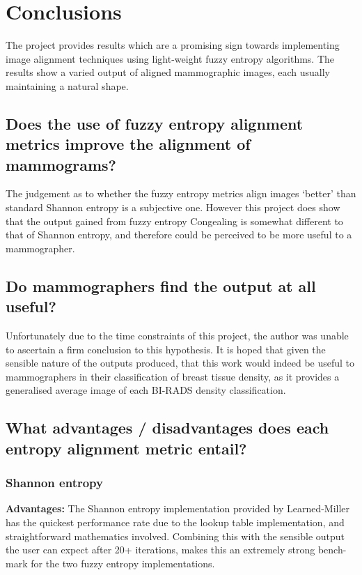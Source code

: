 \section{Conclusions}

The project provides results which are a promising sign towards implementing image alignment techniques using light-weight fuzzy entropy algorithms. The results show a varied output of aligned mammographic images, each usually maintaining a natural shape.

\subsection{Does the use of fuzzy entropy alignment metrics improve the alignment of mammograms?}

The judgement as to whether the fuzzy entropy metrics align images `better' than standard Shannon entropy is a subjective one. However this project does show that the output gained from fuzzy entropy \gls{Congealing} is somewhat different to that of Shannon entropy, and therefore could be perceived to be more useful to a mammographer.

\subsection{Do mammographers find the output at all useful?}

Unfortunately due to the time constraints of this project, the author was unable to ascertain a firm conclusion to this hypothesis. It is hoped that given the sensible nature of the outputs produced, that this work would indeed be useful to mammographers in their classification of breast tissue density, as it provides a generalised average image of each BI-RADS density classification.

\subsection{What advantages / disadvantages does each entropy alignment metric entail?}

\subsubsection{Shannon entropy}

\textbf{Advantages: }
The Shannon entropy implementation provided by Learned-Miller has the quickest performance rate due to the lookup table implementation, and straightforward mathematics involved. Combining this with the sensible output the user can expect after 20+ iterations, makes this an extremely strong bench-mark for the two fuzzy entropy implementations.

